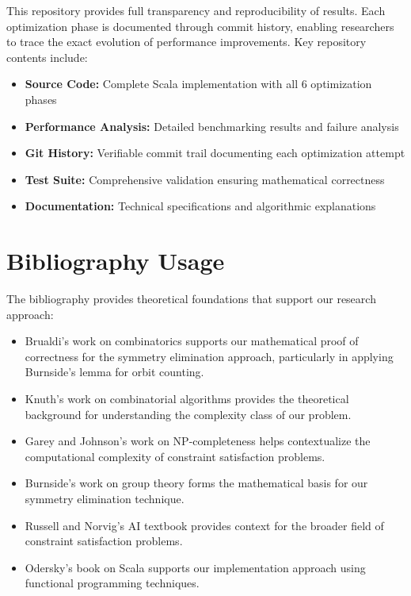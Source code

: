 \documentclass[12pt,a4paper]{article}
\theoremstyle{definition}
\begin{document}
This repository provides full transparency and reproducibility of results. Each optimization phase is documented through commit history, enabling researchers to trace the exact evolution of performance improvements. Key repository contents include:

\begin{itemize}
\item \textbf{Source Code:} Complete Scala implementation with all 6 optimization phases
\item \textbf{Performance Analysis:} Detailed benchmarking results and failure analysis
\item \textbf{Git History:} Verifiable commit trail documenting each optimization attempt
\item \textbf{Test Suite:} Comprehensive validation ensuring mathematical correctness
\item \textbf{Documentation:} Technical specifications and algorithmic explanations
\end{itemize}

\section{Bibliography Usage}

The bibliography provides theoretical foundations that support our research approach:
\begin{itemize}
    \item Brualdi's work on combinatorics \cite{brualdi2010} supports our mathematical proof of correctness for the symmetry elimination approach, particularly in applying Burnside's lemma for orbit counting.
    \item Knuth's work on combinatorial algorithms \cite{knuth1975} provides the theoretical background for understanding the complexity class of our problem.
    \item Garey and Johnson's work on NP-completeness \cite{garey1979} helps contextualize the computational complexity of constraint satisfaction problems.
    \item Burnside's work on group theory \cite{burnside1897} forms the mathematical basis for our symmetry elimination technique.
    \item Russell and Norvig's AI textbook \cite{russell2020} provides context for the broader field of constraint satisfaction problems.
    \item Odersky's book on Scala \cite{scala2021} supports our implementation approach using functional programming techniques.
\end{itemize}
\end{document}
